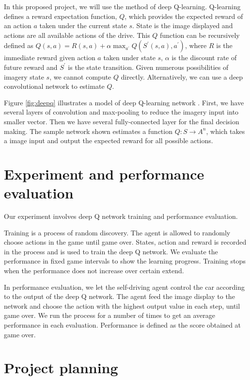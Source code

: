 \documentclass[a4paper]{article}
\begin{document}
In this proposed project, we will use the method of deep Q-learning. Q-learning defines a reward expectation function, $Q$, which provides the expected reward of an action $a$ taken under the current state $s$. State is the image displayed and actions are all available actions of the drive. This $Q$ function can be recursively defined as $Q(s,a) = R(s,a) + \alpha \max_{a^{'}} Q(S^{'}(s,a),a^{'})$, where $R$ is the immediate reward given action $a$ taken under state $s$, $\alpha$ is the discount rate of future reward and $S^{'}$ is the state transition. Given numerous possibilities of imagery state $s$, we cannot compute $Q$ directly. Alternatively, we can use a deep convolutional network to estimate $Q$.

Figure \ref{fig:deepq} illustrates a model of deep Q-learning network \cite{dqn}. First, we have several layers of convolution and max-pooling to reduce the imagery input into smaller vector. Then we have several fully-connected layer for the final decision making. The sample network shown estimates a function $Q : S \rightarrow A^n$, which takes a image input and output the expected reward for all possible actions.

\section{Experiment and performance evaluation}

Our experiment involves deep Q network training and performance evaluation. 

Training is a process of random discovery. The agent is allowed to randomly choose actions in the game until game over. States, action and reward is recorded in the process and is used to train the deep Q network. We evaluate the performance in fixed game intervals to show the learning progress. Training stops when the performance does not increase over certain extend.

In performance evaluation, we let the self-driving agent control the car according to the output of the deep Q network. The agent feed the image display to the network and choose the action with the highest output value in each step, until game over. We run the process for a number of times to get an average performance in each evaluation. Performance is defined as the score obtained at game over.

\section {Project planning}
\end{document}
